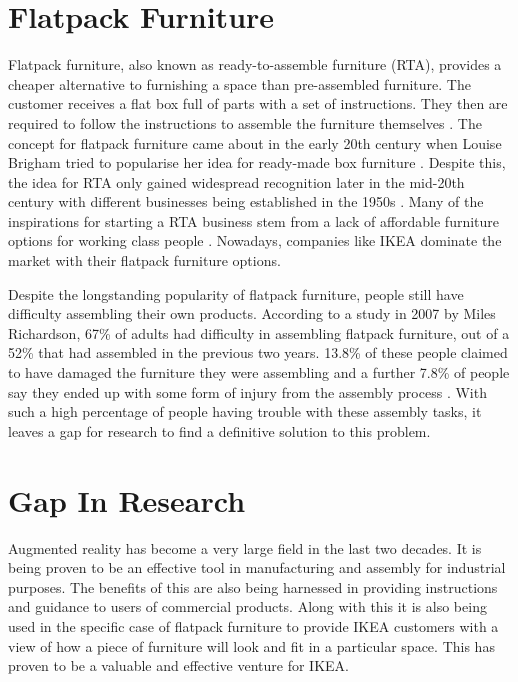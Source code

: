 \documentclass{l4proj}
\begin{document}
\section{Flatpack Furniture}

Flatpack furniture, also known as ready-to-assemble furniture (RTA), provides a cheaper alternative to furnishing a space than pre-assembled furniture. The customer receives a flat box full of parts with a set of instructions. They then are required to follow the instructions to assemble the furniture themselves \citep{fleming_ritsy_nodate}. The concept for flatpack furniture came about in the early 20th century when Louise Brigham tried to popularise her idea for ready-made box furniture \citep{lafarge_ready--assemble_2019}. Despite this, the idea for RTA only gained widespread recognition later in the mid-20th century with different businesses being established in the 1950s \citep{lafarge_ready--assemble_2019}. Many of the inspirations for starting a RTA business stem from a lack of affordable furniture options for working class people \citep{lafarge_ready--assemble_2019}. Nowadays, companies like IKEA dominate the market with their flatpack furniture options.

Despite the longstanding popularity of flatpack furniture, people still have difficulty assembling their own products. According to a study in 2007 by Miles Richardson, 67\% of adults had difficulty in assembling flatpack furniture, out of a 52\% that had assembled in the previous two years. 13.8\% of these people claimed to have damaged the furniture they were assembling and a further 7.8\% of people say they ended up with some form of injury from the assembly process \cite{Richardson11}. With such a high percentage of people having trouble with these assembly tasks, it leaves a gap for research to find a definitive solution to this problem.

\section{Gap In Research}

Augmented reality has become a very large field in the last two decades. It is being proven to be an effective tool in manufacturing and assembly for industrial purposes. The benefits of this are also being harnessed in providing instructions and guidance to users of commercial products. Along with this it is also being used in the specific case of flatpack furniture to provide IKEA customers with a view of how a piece of furniture will look and fit in a particular space. This has proven to be a valuable and effective venture for IKEA. 
\end{document}
